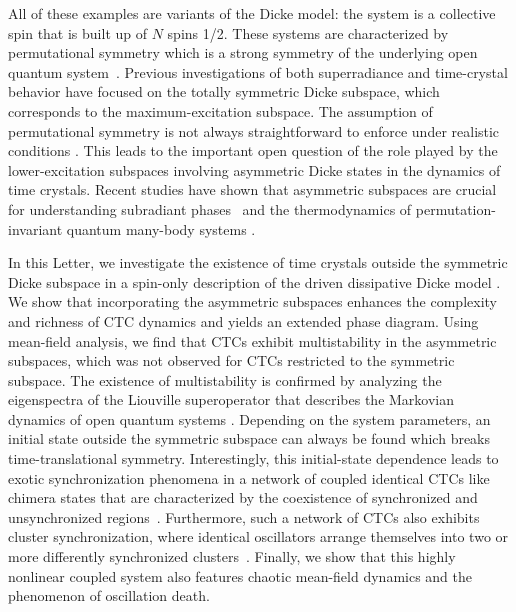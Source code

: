 \documentclass[pra,aps,twocolumn,superscriptaddress,notitlepage]{revtex4-1}
\begin{document}
	
	All of these examples are variants of the Dicke model: the system is a collective spin that is built up of $N$ spins 1/2. These systems are characterized by permutational symmetry which is a strong symmetry of the underlying open quantum system~\cite{buca2012,albert2014symmetries}.
	Previous investigations of both superradiance \cite{dicke1954coherence,AnatoliiVAndreev_1980,wang1973phase,scully2009super} and time-crystal behavior have focused on the totally symmetric Dicke subspace, which corresponds to the maximum-excitation subspace.
	The assumption of permutational symmetry is not always straightforward to enforce under realistic conditions \cite{ferioli2023non}. 
	This leads to the important open question of the role played by the lower-excitation subspaces involving asymmetric Dicke states in the dynamics of time crystals. Recent studies have shown that asymmetric subspaces are crucial for understanding subradiant phases~\cite{PhysRevLett.120.113603,PhysRevA.106.053712, gegg2018superradiant,PhysRevA.84.023805} and the thermodynamics of permutation-invariant quantum many-body systems \cite{latune2019thermodynamics,Latune_2020,yadin2023thermo}.
	
	
	In this Letter, we investigate the existence of time crystals outside the symmetric Dicke subspace in a spin-only description of the driven dissipative Dicke model \cite{iemini2018boundary,seeding2022michal}.
	We show that incorporating the asymmetric subspaces enhances the complexity and richness of CTC dynamics and yields an extended phase diagram.
	Using mean-field analysis, we find that CTCs exhibit multistability in the asymmetric subspaces, which was not observed for CTCs restricted to the symmetric subspace.
	The existence of multistability is confirmed by analyzing the eigenspectra of the Liouville superoperator that describes the Markovian dynamics of open quantum systems \cite{buca2012,victor2014,krishna2023select}. 
	Depending on the system parameters, an initial state outside the symmetric subspace can always be found which breaks time-translational symmetry. 
	Interestingly, this initial-state dependence leads to exotic synchronization phenomena in a network of coupled identical CTCs 
	like chimera states that are characterized by the coexistence of synchronized and unsynchronized regions~\cite{kuramoto2002coexistence,Abrams2004,multistability1,multistability2,multistability3}.
	Furthermore, such a network of CTCs also exhibits cluster synchronization, where identical oscillators arrange themselves into two or more differently synchronized clusters~\cite{Haugland_2021}.
	Finally, we show that this highly nonlinear coupled system also features chaotic mean-field dynamics and the phenomenon of oscillation death.
	
\end{document}
